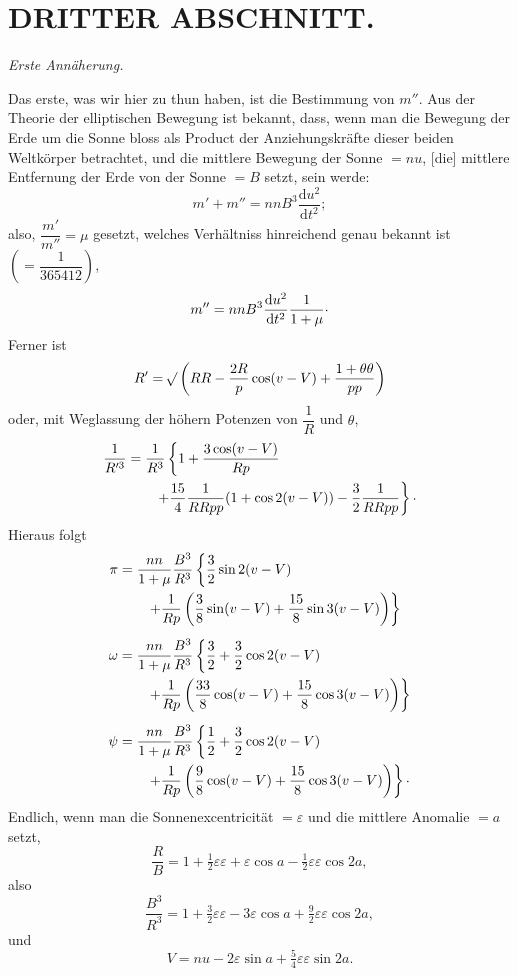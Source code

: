 \clearpage
\begingroup
{}
\renewcommand{\headrulewidth}{0pt}
\section*{DRITTER ABSCHNITT.}
\begin{center}
\itshape Erste Annäherung.
\end{center}

\par\noindent\hspace*{\parindent}Das erste, was wir hier zu thun haben, ist die Bestimmung von \(m''\).
Aus der Theorie der elliptischen Bewegung ist bekannt, dass, wenn man die
Bewegung der Erde um die Sonne bloss als Product der Anziehungskräfte dieser
beiden Weltkörper betrachtet, und die mittlere Bewegung der Sonne \(=nu\),
[die] mittlere Entfernung der Erde von der Sonne \(=B\) setzt, sein werde:
\[
m'+m''=nnB^3\frac{\mathrm{d}u^2}{\mathrm{d}t^2};
\]
\noindent also, \(\dfrac{m'}{m''}=\mu\) gesetzt, welches Verhältniss hinreichend genau
bekannt ist \(\left(=\dfrac{1}{365412}\right)\),
\[
m''=nnB^3\frac{\mathrm{d}u^2}{\mathrm{d}t^2}\frac{1}{1+\mu}
\mathpunct{\raisebox{.4ex}{.}}
\]
\noindent Ferner ist
\[
R'=\mathord{{}^{}\!\surd}\left(RR-\frac{2R}{p}\cos(v-V)+\frac{1+\theta\theta}{pp}\right)
\]
\noindent oder, mit Weglassung der höhern Potenzen von \(\dfrac{1}{R}\) und \(\theta\),
\[
\begin{aligned}
\frac{1}{R'^3}&=\frac{1}{R^3}\left\{1+\frac{3\cos(v-V)}{Rp}\right.\\
&\qquad\left.+\frac{15}{4}\frac{1}{RRpp}(1+\cos2(v-V))
-\frac32\frac{1}{RRpp}\right\}\mathpunct{\raisebox{.4ex}{.}}
\end{aligned}
\]
\noindent Hieraus folgt
\[
\begin{aligned}
\pi&=\frac{nn}{1+\mu}\frac{B^3}{R^3}\left\{\frac32\sin2(v-V)\right.\\
&\qquad\left.+\frac{1}{Rp}\left(\frac38\sin(v-V)+\frac{15}{8}\sin3(v-V)\right)\right\}\\[5pt]
\omega&=\frac{nn}{1+\mu}\frac{B^3}{R^3}\left\{\frac32+\frac32\cos2(v-V)\right.\\
&\qquad\left.+\frac{1}{Rp}\left(\frac{33}{8}\cos(v-V)+\frac{15}{8}\cos3(v-V)\right)\right\}\\[5pt]
\psi&=\frac{nn}{1+\mu}\frac{B^3}{R^3}\left\{\frac12+\frac32\cos2(v-V)\right.\\
&\qquad\left.+\frac{1}{Rp}\left(\frac98\cos(v-V)+\frac{15}{8}\cos3(v-V)\right)\right\}
\mathpunct{\raisebox{.4ex}{.}}
\end{aligned}
\]
\noindent Endlich, wenn man die Sonnenexcentricität \(=\varepsilon\) und die mittlere
Anomalie \(=a\) setzt,
\[
\frac{R}{B}=1+\tfrac12\varepsilon\varepsilon+\varepsilon\cos a
-\tfrac12\varepsilon\varepsilon\cos2a,
\]
\noindent also
\[
\frac{B^3}{R^3}=1+\tfrac32\varepsilon\varepsilon-3\varepsilon\cos a
+\tfrac92\varepsilon\varepsilon\cos2a,
\]
\noindent und
\[
V=nu-2\varepsilon\sin a+\tfrac54\varepsilon\varepsilon\sin2a.
\]

